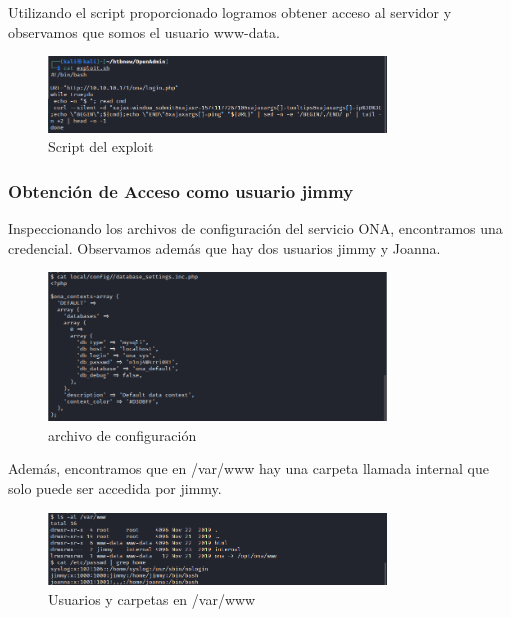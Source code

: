 \documentclass{article}
\begin{document}
Utilizando el script proporcionado logramos obtener acceso al servidor y observamos que somos el usuario www-data.
\begin{figure}[h]
	\center
	\includegraphics[width=0.8\textwidth]{images/openadmin/7-script.png}
	\caption{Script del exploit}
\end{figure}

\subsubsection{Obtención de Acceso como usuario jimmy}

Inspeccionando los archivos de configuración del servicio ONA, encontramos una credencial. Observamos además que hay dos usuarios jimmy y Joanna.
\begin{figure}[h]
	\center
	\includegraphics[width=0.8\textwidth]{images/openadmin/8-credencialesjimmy.png}
	\caption{archivo de configuración}
\end{figure}

Además, encontramos que en /var/www hay una carpeta llamada internal que solo puede ser accedida por jimmy.
\begin{figure}[h]
	\center
	\includegraphics[width=0.8\textwidth]{images/openadmin/9-usuariosycarpetas.png}
	\caption{Usuarios y carpetas en /var/www}
\end{figure}
\end{document}
